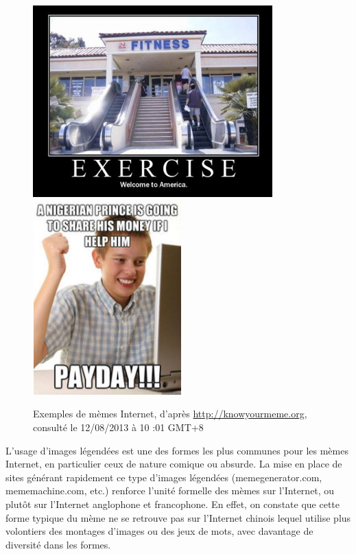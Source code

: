 \begin{figure}[htbp]
    \centering
    \includegraphics[width=3.6335in,height=2.9114in]{figures/chap2/chapitre2-img3.jpg}
    \includegraphics[width=2.2559in,height=2.9449in]{figures/chap2/chapitre2-img4.jpg}
    \caption[Exemples de mèmes internet]{Exemples de mèmes Internet, d{\textquoteright}après \url{http://knowyourmeme.org}, consulté le 12/08/2013 à 10 :01 GMT+8}
    \label{fig:memes-examples}
\end{figure}

L{\textquoteright}usage d{\textquoteright}images légendées est une des formes les plus communes pour les mèmes Internet, en particulier ceux de nature comique ou absurde. La mise en place de sites générant rapidement ce type d{\textquoteright}images légendées (memegenerator.com, mememachine.com, etc.) renforce l{\textquoteright}unité formelle des mèmes sur l{\textquoteright}Internet, ou plutôt sur l{\textquoteright}Internet anglophone et francophone. En effet, on constate que cette forme typique du mème ne se retrouve pas sur l{\textquoteright}Internet chinois lequel utilise plus volontiers des montages d{\textquoteright}images ou des jeux de mots, avec davantage de diversité dans les formes.

